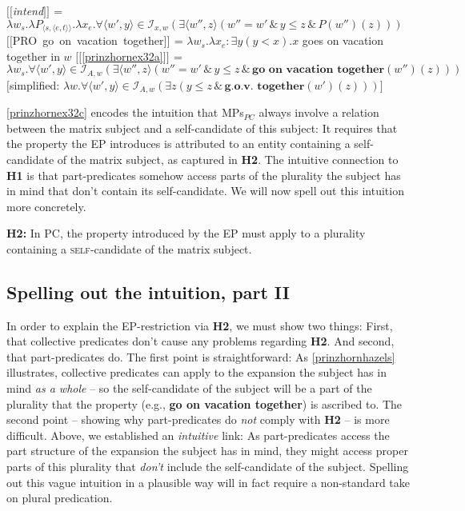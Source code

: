 \documentclass[output=paper,colorlinks,citecolor=brown,
]{langscibook}
\newcommand{\sem}[2]{\mbox{$[\![${#2}$]\!]^{#1}$}} %
\begin{document}
\ea 	\label{prinzhornhazels}
 \label{prinzhornex32a}
\ex   \sem{}{\textit{intend}} = $\lambda w_{s}. \lambda P_{\langle s,\langle e,t \rangle \rangle}. \lambda x_{e}. \forall \langle w' ,y \rangle \in \mathcal{I}_{x,w} (\exists \langle w'', z \rangle (w'' = w' \, \& \, y \le z\, \& \,P(w'')(z)))$ \label{prinzhornex32b}
\ex \sem{}{PRO go on vacation together} = $\lambda w_{s}. \lambda x_{e}: \exists y (y < x). x$ goes on vacation together in $w$\label{prinzhornex32c}
\ex   \sem{}{\ref{prinzhornex32a}} = $\lambda w_{s}. \forall \langle w' ,y \rangle \in \mathcal{I}_{A,w} (\exists \langle w'', z \rangle (w'' = w' \, \& \, y \le z\, \& \,\textbf{go on vacation together} (w'')(z)))$ \\
$[$simplified: $\lambda w. \forall \langle w' ,y \rangle \in \mathcal{I}_{A,w} (\exists z (y \le z\, \& \,\textbf{g.o.v. together} (w')(z)))]$ \label{prinzhornex32d}
\z\z

\ref{prinzhornex32c} encodes the intuition that MPs$_{PC}$ always involve a relation between the matrix subject and a self-candidate of this subject: It requires that  the property  the EP introduces is attributed to an entity containing a self-candidate of the matrix subject, as captured in \textbf{H2}. The intuitive connection to \textbf{H1} is that part-predicates somehow access parts of the plurality the subject has in mind that don't contain its self-candidate. We will now spell out this intuition more concretely.


\ea \textbf{H2:} In PC, the property introduced by the EP must apply to a plurality containing a \textsc{self}-candidate of the matrix subject. \label{prinzhornexr2} \z









\subsection{Spelling out the intuition, part II}\label{prinzhornsec:4.2}

In order to explain the EP-restriction via \textbf{H2}, we must show two things: First,  that collective predicates don't cause any problems regarding \textbf{H2}. And second, that part-predicates do. The first point is straightforward: As \ref{prinzhornhazels} illustrates, collective predicates can apply to the expansion the subject has in mind \textit{as a whole} -- so  the self-candidate of the subject will  be a part of the plurality that the property (e.g., \textbf{go on vacation together})  is ascribed to. The second point -- showing why part-predicates do \textit{not}  comply with \textbf{H2} -- is more difficult. Above, we established an \textit{intuitive} link: As part-predicates access the part structure of the expansion the subject has in mind, they might access proper parts of this plurality that \textit{don't} include the self-candidate of the subject. Spelling out this vague intuition in a plausible way will in fact require a non-standard take on plural predication.
\end{document}
